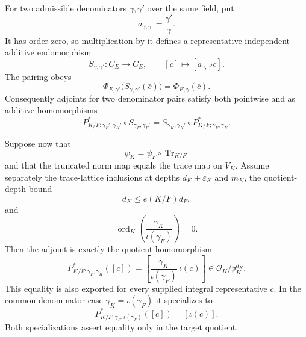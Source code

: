 \begin{definition}
For two admissible denominators $\gamma,\gamma'$ over the same field, put
\[
 a_{\gamma,\gamma'}=\frac{\gamma'}{\gamma}.
\]
It has order zero, so multiplication by it defines a
representative-independent additive endomorphism
\[
 S_{\gamma,\gamma'}:C_E\longrightarrow C_E,
 \qquad [c]\longmapsto[a_{\gamma,\gamma'}c].
\]
The pairing obeys
\[
 \Phi_{E,\gamma'}\bigl(S_{\gamma,\gamma'}(\bar c)\bigr)
 =\Phi_{E,\gamma}(\bar c).
\]
Consequently adjoints for two denominator pairs satisfy both pointwise and
as additive homomorphisms
\[
 P^*_{K/F;\gamma_F',\gamma_K'}\circ
   S_{\gamma_F,\gamma_F'}
 =
 S_{\gamma_K,\gamma_K'}\circ
   P^*_{K/F;\gamma_F,\gamma_K}.
\]

Suppose now that
\[
 \psi_K=\psi_F\circ\operatorname{Tr}_{K/F}
\]
and that the truncated norm map equals the trace map on $V_K$.  Assume
separately the trace-lattice inclusions at depths
$d_K+\varepsilon_K$ and $m_K$, the quotient-depth bound
\[
 d_K\leq e(K/F)d_F,
\]
and
\[
 \operatorname{ord}_K\!\left(
   \frac{\gamma_K}{\iota(\gamma_F)}\right)=0.
\]
Then the adjoint is exactly the quotient homomorphism
\[
 P^*_{K/F;\gamma_F,\gamma_K}([c])
 =
 \left[
   \frac{\gamma_K}{\iota(\gamma_F)}\,\iota(c)
 \right]
 \in\mathcal O_K/\mathfrak p_K^{d_K}.
\]
This equality is also exported for every supplied integral representative
$c$.  In the common-denominator case
$\gamma_K=\iota(\gamma_F)$ it specializes to
\[
 P^*_{K/F;\gamma_F,\iota(\gamma_F)}([c])=[\iota(c)].
\]
Both specializations assert equality only in the target quotient.


\end{definition}
